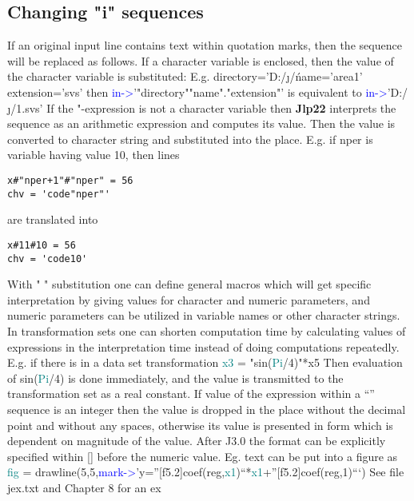  
\subsection{Changing "i" sequences} 
\label{inpureplace} 
If an original input line contains text within quotation marks, then the sequence will be replaced 
as follows. If a character variable is enclosed, then the value of the character variable is 
substituted: E.g. 
directory='D:/\j/\' 
name='area1' 
extension='svs' 
then 
\textcolor{blue}{in->}'"directory""name"."extension"' 
is equivalent to 
\textcolor{blue}{in->}'D:/\j/\area1.svs' 
If the "-expression is not a character variable then \textbf{Jlp22} interprets the sequence as an arithmetic 
expression and computes its value. Then the value is converted to character string and 
substituted into the place. E.g. if nper is variable having value 10, then lines 
\color{Green} 
\begin{verbatim} 
x#"nper+1"#"nper" = 56 
chv = 'code"nper"' 
\end{verbatim} 
\color{Black} 
are translated into 
\color{Green} 
\begin{verbatim} 
x#11#10 = 56 
chv = 'code10' 
\end{verbatim} 
\color{Black} 
 
With " " substitution one can define general macros which will get specific interpretation by 
giving values for character and numeric parameters, and numeric parameters can be utilized in 
variable names or other character strings. In transformation sets one can shorten computation 
time by calculating values of expressions in the interpretation time instead of doing 
computations repeatedly. E.g. if there is in a data set transformation 
\textcolor{teal}{x3} = "\textcolor{VioletRed}{sin}(\textcolor{teal}{Pi}/4)"*x5 
Then evaluation of \textcolor{VioletRed}{sin}(\textcolor{teal}{Pi}/4) is done immediately, and the value is transmitted to the 
transformation set as a real constant. 
If value of the expression within a “” sequence is an integer then the value is dropped in the 
place without the decimal point and without any spaces, otherwise its value is presented in 
form which is dependent on magnitude of the value. After J3.0 the format can be explicitly 
specified within [] before the numeric value. Eg. text can be put into a figure as 
\textcolor{teal}{fig} = 
\textcolor{VioletRed}{drawline}(5,5,\textcolor{blue}{mark->}’y=”[f5.2]coef(reg,\textcolor{teal}{x1})“*\textcolor{teal}{x1}+”[f5.2]coef(reg,1)“‘) 
See file jex.txt and Chapter 8 for an ex 
